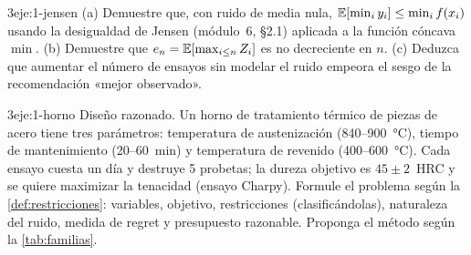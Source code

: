 \begin{ejercicio}{3}{eje:1-jensen}
(a) Demuestre que, con ruido de media nula, $\mathbb{E}[\min_i y_i]\le\min_i f(x_i)$ usando la desigualdad de Jensen (módulo~6, §2.1) aplicada a la función cóncava $\min$. (b) Demuestre que $e_n=\mathbb{E}[\max_{i\le n}Z_i]$ es no decreciente en $n$. (c) Deduzca que aumentar el número de ensayos sin modelar el ruido empeora el sesgo de la recomendación «mejor observado».
\end{ejercicio}

\begin{ejercicio}{3}{eje:1-horno}
Diseño razonado. Un horno de tratamiento térmico de piezas de acero tiene tres parámetros: temperatura de austenización (840–900~°C), tiempo de mantenimiento (20–60~min) y temperatura de revenido (400–600~°C). Cada ensayo cuesta un día y destruye 5 probetas; la dureza objetivo es $45\pm2$~HRC y se quiere maximizar la tenacidad (ensayo Charpy). Formule el problema según la \cref{def:restricciones}: variables, objetivo, restricciones (clasificándolas), naturaleza del ruido, medida de regret y presupuesto razonable. Proponga el método según la \cref{tab:familias}.
\end{ejercicio}
